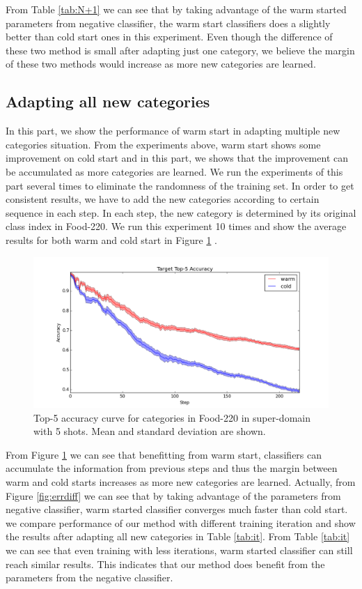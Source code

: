 From Table \ref{tab:N+1} we can see that by taking advantage of the warm started parameters from negative classifier, the warm start classifiers does a slightly better than cold start ones in this experiment. Even though the difference of these two method is small after adapting just one category, we believe the margin of these two methods would increase as more new categories are learned.
\subsection{Adapting all new categories}
In this part, we show the performance of warm start in adapting multiple new categories situation. From the experiments above, warm start shows some improvement on cold start and in this part, we shows that the improvement can be accumulated as more categories are learned. We run the experiments of this part several times to eliminate the randomness of the training set. In order to get consistent results, we have to add the new categories according to certain sequence in each step. 
In each step, the new category is determined by its original class index in Food-220. We run this experiment 10 times and show the average results for both warm and cold start in Figure \ref{fig:wama} .

\begin{figure}
  \centering
    \includegraphics[scale=0.4]{fig/M+N.png}
    \caption{Top-5 accuracy curve for categories in Food-220 in super-domain with 5 shots. Mean and standard deviation are shown.}
      \label{fig:wama}
\end{figure}

From Figure \ref{fig:wama} we can see that benefitting from warm start, classifiers can accumulate the information from previous steps and thus the margin between warm and cold starts increases as more new categories are learned. 
Actually, from Figure \ref{fig:errdiff} we can see that by taking advantage of the parameters from negative classifier, warm started classifier converges much faster than cold start. we compare performance of our method with different training iteration and show the results after adapting all new categories in Table \ref{tab:it}. From Table \ref{tab:it} we can see that even training with less iterations, warm started classifier can still reach similar results. This indicates that our method does benefit from the parameters from the negative classifier. 

